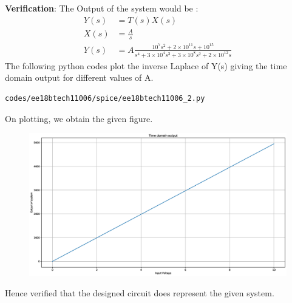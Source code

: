 \begin{enumerate}[label=\arabic*.,ref=\theenumi]
\begin{figure}[!ht]
\caption{}
\label{fig:ee18btech11006_8}
\end{figure}
\textbf{Verification}: The Output of the system would be :
\begin{align}
    Y(s)&=T(s)X(s)\\
    X(s)&=\frac{A}{s}\\
    Y(s)&=A\frac{10^7s^2+2\times10^{11}s+10^{15}}{s^4+3\times10^4s^3+3\times10^8s^2+2\times10^{12}s}
\end{align}
The following python codes plot the inverse Laplace of Y(s) giving the time domain output for different values of A.
\begin{lstlisting}
codes/ee18btech11006/spice/ee18btech11006_2.py
\end{lstlisting}
On plotting, we obtain the given figure.\\
\begin{figure}[!ht]
\centering
\includegraphics[width=\columnwidth]{./figs/ee18btech11006/ee18btech11006_9.eps}
\caption{}
\label{fig:ee18btech11006_9}
\end{figure}
Hence verified that the designed circuit does represent the given system.
\end{enumerate}

